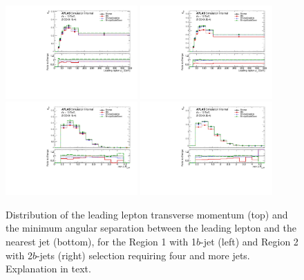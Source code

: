 \begin{figure}[!htb]
\centering
\includegraphics[width=0.45\textwidth]{Plots/ttV/generator/c_Region_0_lep_Pt_0}
\includegraphics[width=0.45\textwidth]{Plots/ttV/generator/c_Region_1_lep_Pt_0}\\
\includegraphics[width=0.45\textwidth]{Plots/ttV/generator/c_Region_0_min_DRl0j}
\includegraphics[width=0.45\textwidth]{Plots/ttV/generator/c_Region_1_min_DRl0j}\\
  \caption{Distribution of the leading lepton transverse momentum (top) and the minimum angular separation between the leading lepton and the nearest jet (bottom), for the Region 1 with 1$b$-jet (left) and Region 2 with 2$b$-jets (right) selection requiring four and more jets. Explanation in text.
  \label{ttV:den_lep_kin}}
\end{figure}

